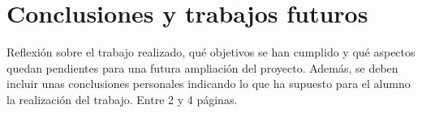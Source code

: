 \cleardoublepage
\chapter{Conclusiones y trabajos futuros}
\label{chap:conclusiones-trabajos-futuros}

Reflexión sobre el trabajo realizado, qué objetivos se han cumplido y qué aspectos quedan pendientes para una futura ampliación del proyecto. Además, se deben incluir unas conclusiones personales indicando lo que ha supuesto para el alumno la realización del trabajo. Entre 2 y 4 páginas.
